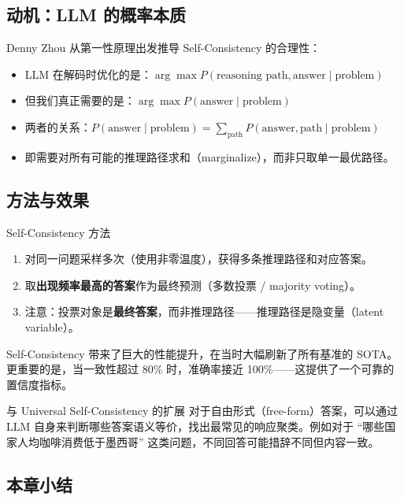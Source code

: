\documentclass[a4paper]{article}
\begin{document}
\subsection{动机：LLM 的概率本质}

Denny Zhou 从第一性原理出发推导 Self-Consistency 的合理性：

\begin{itemize}
    \item LLM 在解码时优化的是：$\arg\max P(\text{reasoning path}, \text{answer} \mid \text{problem})$
    \item 但我们真正需要的是：$\arg\max P(\text{answer} \mid \text{problem})$
    \item 两者的关系：$P(\text{answer} \mid \text{problem}) = \sum_{\text{path}} P(\text{answer}, \text{path} \mid \text{problem})$
    \item 即需要对所有可能的推理路径求和（marginalize），而非只取单一最优路径。
\end{itemize}

\subsection{方法与效果}

\begin{importantbox}{Self-Consistency 方法}
\begin{enumerate}
    \item 对同一问题采样多次（使用非零温度），获得多条推理路径和对应答案。
    \item 取\textbf{出现频率最高的答案}作为最终预测（多数投票 / majority voting）。
    \item 注意：投票对象是\textbf{最终答案}，而非推理路径——推理路径是隐变量（latent variable）。
\end{enumerate}
\end{importantbox}

Self-Consistency 带来了巨大的性能提升，在当时大幅刷新了所有基准的 SOTA。更重要的是，当一致性超过 80\% 时，准确率接近 100\%——这提供了一个可靠的置信度指标。

\begin{knowledgebox}{与 Universal Self-Consistency 的扩展}
对于自由形式（free-form）答案，可以通过 LLM 自身来判断哪些答案语义等价，找出最常见的响应聚类。例如对于 ``哪些国家人均咖啡消费低于墨西哥'' 这类问题，不同回答可能措辞不同但内容一致。
\end{knowledgebox}

\subsection{本章小结}
\end{document}
